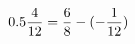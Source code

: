 \documentclass[preview]{standalone}
\begin{document}
\begin{align*}
\special{dvisvgm:raw <g id='unique000'>}0.5 \frac{4}{12} = \frac{6}{8} - (- \frac{1}{12})\special{dvisvgm:raw </g>}
\end{align*}
\end{document}

